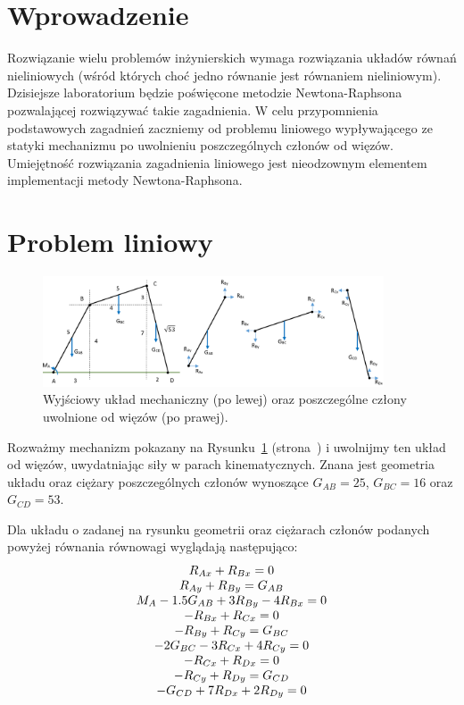 \documentclass{instrukcja}
\begin{document}
\author{B. Górecki}
\materialtitle

\section*{Wprowadzenie}

Rozwiązanie wielu problemów inżynierskich wymaga rozwiązania układów równań nieliniowych (wśród których choć jedno równanie jest równaniem nieliniowym). Dzisiejsze laboratorium będzie poświęcone metodzie Newtona-Raphsona pozwalającej rozwiązywać takie zagadnienia. W celu przypomnienia podstawowych zagadnień zaczniemy od problemu liniowego wypływającego ze statyki mechanizmu po uwolnieniu poszczególnych członów od więzów. Umiejętność rozwiązania zagadnienia liniowego jest nieodzownym elementem implementacji metody Newtona-Raphsona.

\section{Problem liniowy}
\begin{figure}[h]\label{uklad1}
\centering
\includegraphics[width=0.9\textwidth]{mechanizm.png}
\caption[c]{Wyjściowy układ mechaniczny (po lewej) oraz poszczególne człony uwolnione od więzów (po prawej).}
\end{figure}
Rozważmy mechanizm pokazany na Rysunku~\ref{uklad1}
(strona~\pageref{uklad1}) i uwolnijmy ten układ od więzów, uwydatniając siły w parach kinematycznych. Znana jest geometria układu oraz ciężary poszczególnych członów wynoszące $G_{AB}=25$, $G_{BC}=16$ oraz $G_{CD}=53$.


Dla układu o zadanej na rysunku geometrii oraz ciężarach członów podanych powyżej równania równowagi wyglądają następująco:
\begin{displaymath}
\begin{tabular}{c}
$R_{Ax}+R_{Bx} = 0$ \\
$R_{Ay}+R_{By} = G_{AB}$ \\
$M_A-1.5G_{AB}+3R_{By}-4R_{Bx}=0$ \\
$-R_{Bx}+R_{Cx}=0$ \\
$-R_{By}+R_{Cy}=G_{BC}$ \\
$-2G_{BC}-3R_{Cx}+4R_{Cy}=0$ \\
$-R_{Cx}+R_{Dx}=0$ \\
$-R_{Cy}+R_{Dy}=G_{CD}$ \\
$-G_{CD}+7R_{Dx}+2R_{Dy}=0$ \\
\end{tabular}
\end{displaymath}
\end{document}
